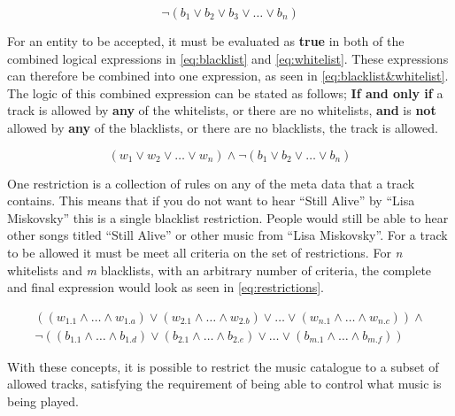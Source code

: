 \begin{equation}
\label{eq:blacklist}
	\neg(b_1 \vee b_2 \vee b_3 \vee \dots \vee b_n)
\end{equation}

For an entity to be accepted, it must be evaluated as \textbf{true} in both of the combined logical expressions in \cref{eq:blacklist} and \cref{eq:whitelist}. These expressions can therefore be combined into one expression, as seen in \cref{eq:blacklist&whitelist}. The logic of this combined expression can be stated as follows; \textbf{If and only if} a track is allowed by \textbf{any} of the whitelists, or there are no whitelists, \textbf{and} is \textbf{not} allowed by \textbf{any} of the blacklists, or there are no blacklists, the track is allowed.

\begin{equation}
\label{eq:blacklist&whitelist}
		(w_1 \vee w_2 \vee \dots \vee w_n) \wedge \neg(b_1 \vee b_2 \vee \dots \vee b_n)
\end{equation}

One restriction is a collection of rules on any of the meta data that a track contains. This means that if you do not want to hear \enquote{Still Alive} by \enquote{Lisa Miskovsky} this is a single blacklist restriction. People would still be able to hear other songs titled \enquote{Still Alive} or other music from \enquote{Lisa Miskovsky}. For a track to be allowed it must be meet all criteria on the set of restrictions. For \emph{n} whitelists and \emph{m} blacklists, with an arbitrary number of criteria, the complete and final expression would look as seen in \cref{eq:restrictions}.

\begin{eqnarray}
	\label{eq:restrictions}
	((w_{1.1} \wedge \dots \wedge w_{1.a}) \vee (w_{2.1} \wedge \dots \wedge w_{2.b}) \vee \dots \vee (w_{n.1} \wedge \dots \wedge w_{n.c})) \wedge \nonumber \\ \neg((b_{1.1} \wedge \dots \wedge b_{1.d}) \vee (b_{2.1} \wedge \dots \wedge b_{2.e}) \vee \dots \vee (b_{m.1} \wedge \dots \wedge b_{m.f}))
\end{eqnarray}

With these concepts, it is possible to restrict the music catalogue to a subset of allowed tracks, satisfying the requirement of being able to control what music is being played.

